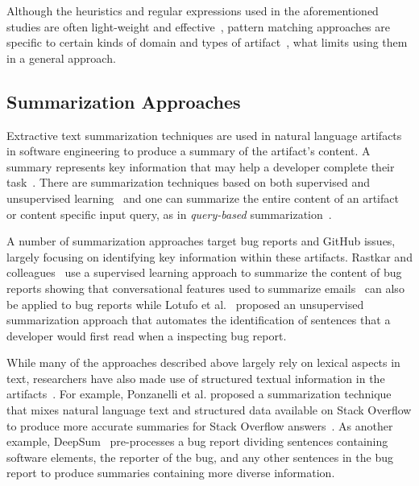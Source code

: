 Although the heuristics and regular expressions used in the aforementioned studies 
are often light-weight and effective~\cite{Bavota2016, Maalej2013}, 
pattern matching approaches are specific to certain kinds of domain and 
types of artifact~\cite{fucci2019}, what limits
using them in a general approach.





\subsection{Summarization Approaches}
\label{cp2:summarization}



Extractive text summarization techniques are used in natural language artifacts in software engineering to
produce a summary of the artifact's content. 
A summary represents key information that may help a developer complete their task~\cite{Bavota2016}.
There are summarization techniques based on both supervised and unsupervised learning~\cite{moreno2017}
and one can summarize the entire content of an artifact
or content specific input query, as in \textit{query-based} summarization~\cite{Huang2018, Goldsteinet1999}.




A number of summarization approaches target bug reports and GitHub issues, largely
focusing on identifying key information within these artifacts. 
Rastkar and colleagues~\cite{Rastkar2010} use a supervised learning approach to summarize the content 
of bug reports showing that conversational features used to summarize emails~\cite{Murray2008}
can also be applied to bug reports while
Lotufo et al.~\cite{Lotufo2012} proposed an unsupervised summarization approach 
that automates the identification of sentences that a developer would first read when
a inspecting bug report.



While many of the approaches described above
largely rely on  lexical aspects in text, researchers have also made use
of structured textual information in the artifacts~\cite{Ponzanelli2015, Treude2016, chen2016}. 
For example, Ponzanelli et al. 
proposed a summarization technique that mixes natural language text and structured data 
available on Stack Overflow
to produce more accurate summaries for Stack Overflow answers~\cite{Ponzanelli2015}. 
As another example, DeepSum~\cite{Li2018} pre-processes a bug report dividing sentences 
containing software elements, the reporter of the bug, and any other sentences 
in the bug report to produce summaries containing more diverse information.




